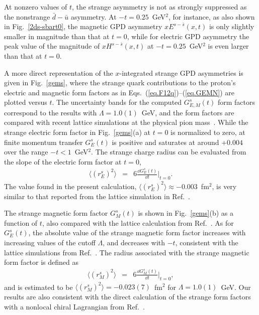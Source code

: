 \documentclass[preprintnumbers,prd,superscriptaddress,preprint]{revtex4-1}
\begin{document}
At nonzero values of $t$, the strange asymmetry is not as strongly suppressed as the nonstrange $\bar d-\bar u$ asymmetry.
At $-t=0.25$~GeV$^2$, for instance, as also shown in Fig.~\ref{2ds-sbart0}, the magnetic GPD asymmetry $xE^{s-\bar{s}}(x,t)$ is only slightly smaller in magnitude than that at $t=0$, while for electric GPD asymmetry the peak value of the magnitude of $xH^{s-\bar{s}}(x,t)$ at $-t=0.25$~GeV$^2$ is even larger than that at $t=0$.


A more direct representation of the $x$-integrated strange GPD asymmetries is given in Fig.~\ref{gems}, where the strange quark contributions to the proton's electric and magnetic form factors as in Eqs.~(\ref{eq.F12q})--(\ref{eq.GEMN}) are plotted versus $t$.
The uncertainty bands for the computed $G_{E,M}^s(t)$ form factors correspond to the results with $\Lambda=1.0(1)$~GeV, and the form factors are compared with recent lattice simulations at the physical pion mass~\cite{Sufian:2017osl}.
While the strange electric form factor in Fig.~\ref{gems}(a) at $t=0$ is normalized to zero, at finite momentum transfer $G_E^s(t)$ is positive and saturates at around $+0.004$ over the range $-t < 1$~GeV$^2$.
The strange charge radius can be evaluated from the slope of the electric form factor at $t=0$, 
%
\begin{eqnarray}
\langle (r^s_E)^2 \rangle &=& 6 \frac{\dd{G}^s_E(t)}{\dd{t}}\bigg|_{t=0}.
\end{eqnarray}
%
The value found in the present calculation, $\langle (r^s_E)^2 \rangle \approx -0.003$~fm$^2$, is very similar to that reported from the lattice simulation in Ref.~\cite{Leinweber:2006ug}.


The strange magnetic form factor $G_M^s(t)$ is shown in Fig.~\ref{gems}(b) as a function of $t$, also compared with the lattice calculation from Ref.~\cite{Sufian:2017osl}.
As for $G_E^s(t)$, the absolute value of the strange magnetic form factor increases with increasing values of the cutoff $\Lambda$, and decreases with $-t$, consistent with the lattice simulations from Ref.~\cite{Sufian:2017osl}.
The radius associated with the strange magnetic form factor is defined as
%
\begin{eqnarray}
\langle (r^s_M)^2 \rangle &=& 6 \frac{\dd{G}^s_M(t)}{\dd{t}}\bigg|_{t=0},
\end{eqnarray}
%
and is estimated to be $\langle (r^s_M)^2 \rangle = -0.023(7)$~fm$^2$ for $\Lambda=1.0(1)$~GeV. 
Our results are also consistent with the direct calculation of the strange form factors with a nonlocal chiral Lagrangian from Ref.~\cite{He:2018eyz}. \\
\end{document}
